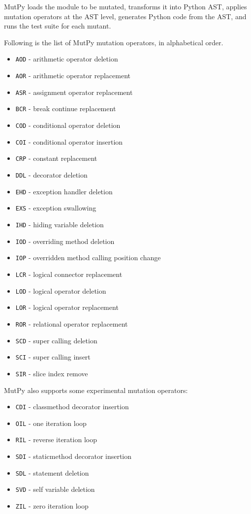 \documentclass[12pt]{article}
\begin{document}
MutPy loads the module to be mutated, transforms it into Python AST, applies mutation operators at the AST level, generates Python code from the AST, and runs the test suite for each mutant.

Following is the list of MutPy mutation operators, in alphabetical order.

\begin{itemize}
  \itemsep0em 
  \item \texttt{AOD} - arithmetic operator deletion
  \item \texttt{AOR} - arithmetic operator replacement
  \item \texttt{ASR} - assignment operator replacement
  \item \texttt{BCR} - break continue replacement
  \item \texttt{COD} - conditional operator deletion
  \item \texttt{COI} - conditional operator insertion
  \item \texttt{CRP} - constant replacement
  \item \texttt{DDL} - decorator deletion
  \item \texttt{EHD} - exception handler deletion
  \item \texttt{EXS} - exception swallowing
  \item \texttt{IHD} - hiding variable deletion
  \item \texttt{IOD} - overriding method deletion
  \item \texttt{IOP} - overridden method calling position change
  \item \texttt{LCR} - logical connector replacement
  \item \texttt{LOD} - logical operator deletion
  \item \texttt{LOR} - logical operator replacement
  \item \texttt{ROR} - relational operator replacement
  \item \texttt{SCD} - super calling deletion
  \item \texttt{SCI} - super calling insert
  \item \texttt{SIR} - slice index remove
\end{itemize}

MutPy also supports some experimental mutation operators:

\begin{itemize}
  \itemsep0em 
  \item \texttt{CDI} - classmethod decorator insertion
  \item \texttt{OIL} - one iteration loop
  \item \texttt{RIL} - reverse iteration loop
  \item \texttt{SDI} - staticmethod decorator insertion
  \item \texttt{SDL} - statement deletion
  \item \texttt{SVD} - self variable deletion
  \item \texttt{ZIL} - zero iteration loop
\end{itemize}
\end{document}
